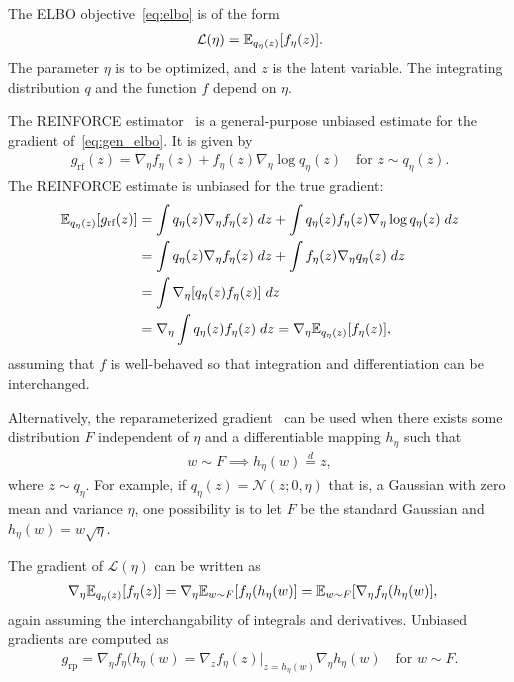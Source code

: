 The ELBO objective~\eqref{eq:elbo} is of the form 
\begin{align}
    \mathcal{L}(\eta) = \mathbb{E}_{q_\eta(z)}[f_\eta(z)].
    \label{eq:gen_elbo}
\end{align}
The parameter $\eta$ is to be optimized, and $z$ is the latent variable. The integrating distribution $q$ and the function $f$ depend on $\eta$. 

The REINFORCE estimator~\cite{Williams1992reinforce} is a general-purpose unbiased estimate for the gradient of~\eqref{eq:gen_elbo}. 
It is given by 
\begin{align}
    g_{\textrm{rf}}(z) = \nabla_\eta f_\eta(z) + 
            f_\eta(z)  \nabla_\eta \log q_\eta(z)
    \quad \text{for } 
    z\sim q_\eta(z). 
\end{align}
The REINFORCE estimate is unbiased for the true gradient:
\begin{align}
    \mathbb{E}_{q_\eta(z)}[g_{\textrm{rf}}(z)] &= 
    \int q_\eta(z) \nabla_\eta f_\eta(z) \; dz+ 
    \int q_\eta(z) f_\eta(z)  \nabla_\eta \log q_\eta(z)\; dz \\
    &= \int q_\eta(z) \nabla_\eta f_\eta(z) \; dz+ 
    \int f_\eta(z) \nabla_\eta q_\eta(z)  \; dz \\
    &= \int \nabla_\eta[q_\eta(z) f_\eta(z)] \; dz \\
    &= \nabla_\eta \int q_\eta(z) f_\eta(z) \; dz 
    = \nabla_\eta \mathbb{E}_{q_\eta(z)}[f_\eta(z)],
\end{align}
assuming that $f$ is well-behaved so that integration and differentiation can be interchanged. 

Alternatively, the reparameterized gradient~\cite{rezende2014stochastic, kingma2013autoencoding} can be used when there exists some distribution $F$ independent of $\eta$ and a differentiable mapping $h_\eta$ such that 
\begin{align}
    w \sim F \implies h_\eta(w) \stackrel{d}{=} z,
\end{align}
where $z\sim q_\eta$. 
For example, if $q_{\eta}(z) = \mathcal{N}(z; 0, \eta)$ that is, a Gaussian with zero mean and variance $\eta$, one possibility is to let $F$ be the standard Gaussian and $h_\eta(w) = w \sqrt{\eta}$. 

The gradient of $\mathcal{L}(\eta)$ can be written as 
\begin{align}
    \nabla_\eta \mathbb{E}_{q_\eta(z)}[f_\eta(z)] &= 
        \nabla_\eta \mathbb{E}_{w\sim F}[f_\eta(h_\eta(w)] = \mathbb{E}_{w\sim F}[\nabla_\eta f_\eta(h_\eta(w)], 
\end{align}
again assuming the interchangability of integrals and derivatives. 
Unbiased gradients are computed as 
\begin{align}
    g_{\textrm{rp}} 
    = \nabla_\eta f_\eta(h_\eta(w)
    = \nabla_z f_\eta(z)\Big|_{z = h_\eta(w)}
    \nabla_\eta h_\eta(w) \quad \text{for } w\sim F. 
\end{align}

